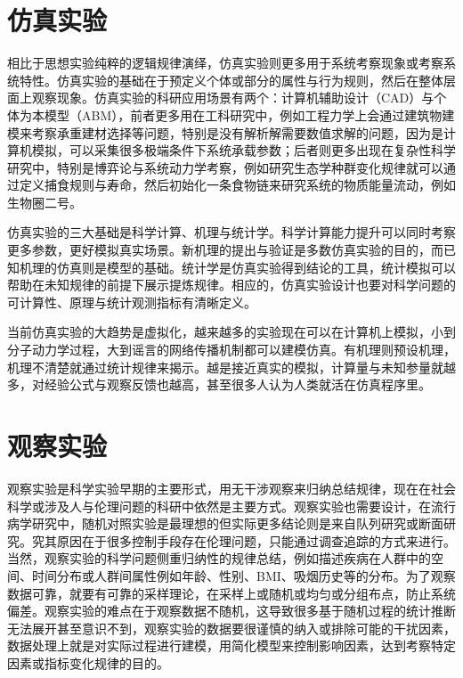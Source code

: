 \documentclass[]{tufte-book}
\begin{document}
\hypertarget{ux4effux771fux5b9eux9a8c}{%
\section{仿真实验}\label{ux4effux771fux5b9eux9a8c}}

相比于思想实验纯粹的逻辑规律演绎，仿真实验则更多用于系统考察现象或考察系统特性。仿真实验的基础在于预定义个体或部分的属性与行为规则，然后在整体层面上观察现象。仿真实验的科研应用场景有两个：计算机辅助设计（CAD）与个体为本模型（ABM），前者更多用在工科研究中，例如工程力学上会通过建筑物建模来考察承重建材选择等问题，特别是没有解析解需要数值求解的问题，因为是计算机模拟，可以采集很多极端条件下系统承载参数；后者则更多出现在复杂性科学研究中，特别是博弈论与系统动力学考察，例如研究生态学种群变化规律就可以通过定义捕食规则与寿命，然后初始化一条食物链来研究系统的物质能量流动，例如生物圈二号。

仿真实验的三大基础是科学计算、机理与统计学。科学计算能力提升可以同时考察更多参数，更好模拟真实场景。新机理的提出与验证是多数仿真实验的目的，而已知机理的仿真则是模型的基础。统计学是仿真实验得到结论的工具，统计模拟可以帮助在未知规律的前提下展示提炼规律。相应的，仿真实验设计也要对科学问题的可计算性、原理与统计观测指标有清晰定义。

当前仿真实验的大趋势是虚拟化，越来越多的实验现在可以在计算机上模拟，小到分子动力学过程，大到谣言的网络传播机制都可以建模仿真。有机理则预设机理，机理不清楚就通过统计规律来揭示。越是接近真实的模拟，计算量与未知参量就越多，对经验公式与观察反馈也越高，甚至很多人认为人类就活在仿真程序里。

\hypertarget{ux89c2ux5bdfux5b9eux9a8c}{%
\section{观察实验}\label{ux89c2ux5bdfux5b9eux9a8c}}

观察实验是科学实验早期的主要形式，用无干涉观察来归纳总结规律，现在在社会科学或涉及人与伦理问题的科研中依然是主要方式。观察实验也需要设计，在流行病学研究中，随机对照实验是最理想的但实际更多结论则是来自队列研究或断面研究。究其原因在于很多控制手段存在伦理问题，只能通过调查追踪的方式来进行。当然，观察实验的科学问题侧重归纳性的规律总结，例如描述疾病在人群中的空间、时间分布或人群间属性例如年龄、性别、BMI、吸烟历史等的分布。为了观察数据可靠，就要有可靠的采样理论，在采样上或随机或均匀或分组布点，防止系统偏差。观察实验的难点在于观察数据不随机，这导致很多基于随机过程的统计推断无法展开甚至意识不到，观察实验的数据要很谨慎的纳入或排除可能的干扰因素，数据处理上就是对实际过程进行建模，用简化模型来控制影响因素，达到考察特定因素或指标变化规律的目的。
\end{document}
